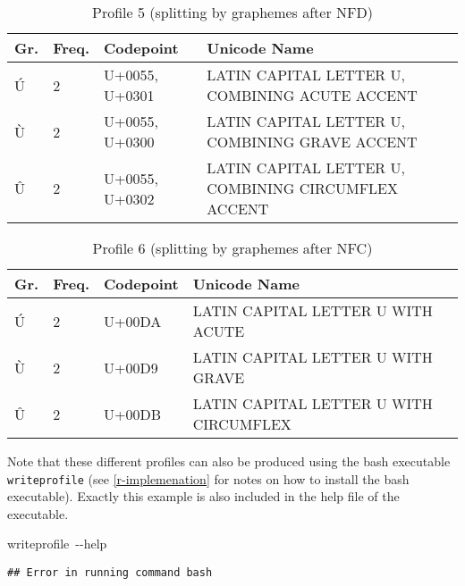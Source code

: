 \documentclass[output=inprep,
		biblatex
		]{LSP/langsci}\usepackage[]{graphicx}\usepackage[]{color}
\makeatletter
\newcommand{\hlstd}[1]{\textcolor[rgb]{0.345,0.345,0.345}{#1}}%
\newcommand{\hlkwb}[1]{\textcolor[rgb]{0.69,0.353,0.396}{#1}}%
\newenvironment{kframe}{%
 \def\at@end@of@kframe{}%
 \ifinner\ifhmode%
  \def\at@end@of@kframe{\end{minipage}}%
  \begin{minipage}{\columnwidth}%
 \fi\fi%
 \def\FrameCommand##1{\hskip\@totalleftmargin \hskip-\fboxsep
 \colorbox{shadecolor}{##1}\hskip-\fboxsep
     \hskip-\linewidth \hskip-\@totalleftmargin \hskip\columnwidth}%
 \MakeFramed {\advance\hsize-\width
   \@totalleftmargin\z@ \linewidth\hsize
   \@setminipage}}%
 {\par\unskip\endMakeFramed%
 \at@end@of@kframe}
\newenvironment{knitrout}{}{} %
\makeatother
\begin{document}
\begin{table}[H]
\centering
\begingroup\scriptsize
\begin{tabular}{llll}
  \toprule
Gr. & Freq. & Codepoint & Unicode Name \\ 
  \midrule
Ú & 2 & U+0055, U+0301 & LATIN CAPITAL LETTER U, COMBINING ACUTE ACCENT \\ 
  Ù & 2 & U+0055, U+0300 & LATIN CAPITAL LETTER U, COMBINING GRAVE ACCENT \\ 
  Û & 2 & U+0055, U+0302 & LATIN CAPITAL LETTER U, COMBINING CIRCUMFLEX ACCENT \\ 
   \bottomrule
\end{tabular}
\endgroup
\caption{Profile 5 (splitting by graphemes after NFD)} 
\label{tab:profile5}
\end{table}


\begin{table}[H]
\centering
\begingroup\scriptsize
\begin{tabular}{llll}
  \toprule
Gr. & Freq. & Codepoint & Unicode Name \\ 
  \midrule
Ú & 2 & U+00DA & LATIN CAPITAL LETTER U WITH ACUTE \\ 
  Ù & 2 & U+00D9 & LATIN CAPITAL LETTER U WITH GRAVE \\ 
  Û & 2 & U+00DB & LATIN CAPITAL LETTER U WITH CIRCUMFLEX \\ 
   \bottomrule
\end{tabular}
\endgroup
\caption{Profile 6 (splitting by graphemes after NFC)} 
\label{tab:profile6}
\end{table}


Note that these different profiles can also be produced using the bash
executable \texttt{writeprofile} (see \ref{r-implemenation} for notes
on how to install the bash executable). Exactly this example is also included in
the help file of the executable.

\begin{knitrout}\scriptsize
{}\color{fgcolor}\begin{kframe}
\noindent
\ttfamily
\hlstd{writeprofile\ }\hlkwb{{-}{-}help}\hlstd{}\hspace*{\fill}
\mbox{}
\normalfont

\begin{verbatim}
## Error in running command bash
\end{verbatim}
\end{kframe}
\end{knitrout}
\end{document}
